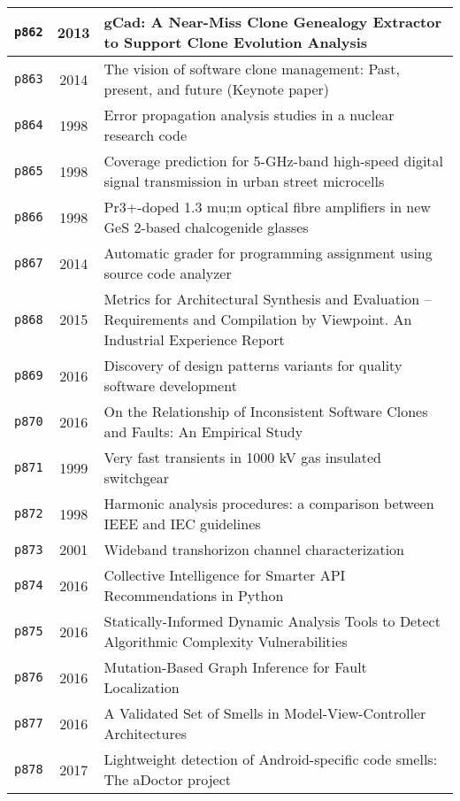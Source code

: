 \begin{longtable}{| c | c | p{16cm} |}
  \hline
  \texttt{p862} & 2013 & gCad: A Near-Miss Clone Genealogy Extractor to Support Clone Evolution Analysis \\
  \hline
  \texttt{p863} & 2014 & The vision of software clone management: Past, present, and future (Keynote paper) \\
  \hline
  \texttt{p864} & 1998 & Error propagation analysis studies in a nuclear research code \\
  \hline
  \texttt{p865} & 1998 & Coverage prediction for 5-GHz-band high-speed digital signal transmission in urban street microcells \\
  \hline
  \texttt{p866} & 1998 & Pr3+-doped 1.3 mu;m optical fibre amplifiers in new GeS 2-based chalcogenide glasses \\
  \hline
  \texttt{p867} & 2014 & Automatic grader for programming assignment using source code analyzer \\
  \hline
  \texttt{p868} & 2015 & Metrics for Architectural Synthesis and Evaluation -- Requirements and Compilation by Viewpoint. An Industrial Experience Report \\
  \hline
  \texttt{p869} & 2016 & Discovery of design patterns variants for quality software development \\
  \hline
  \texttt{p870} & 2016 & On the Relationship of Inconsistent Software Clones and Faults: An Empirical Study \\
  \hline
  \texttt{p871} & 1999 & Very fast transients in 1000 kV gas insulated switchgear \\
  \hline
  \texttt{p872} & 1998 & Harmonic analysis procedures: a comparison between IEEE and IEC guidelines \\
  \hline
  \texttt{p873} & 2001 & Wideband transhorizon channel characterization \\
  \hline
  \texttt{p874} & 2016 & Collective Intelligence for Smarter API Recommendations in Python \\
  \hline
  \texttt{p875} & 2016 & Statically-Informed Dynamic Analysis Tools to Detect Algorithmic Complexity Vulnerabilities \\
  \hline
  \texttt{p876} & 2016 & Mutation-Based Graph Inference for Fault Localization \\
  \hline
  \texttt{p877} & 2016 & A Validated Set of Smells in Model-View-Controller Architectures \\
  \hline
  \texttt{p878} & 2017 & Lightweight detection of Android-specific code smells: The aDoctor project \\

\end{longtable}
